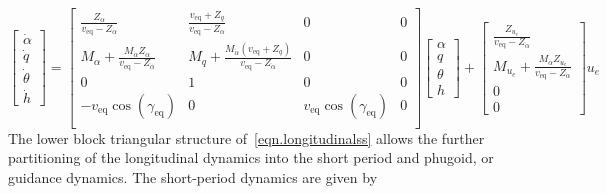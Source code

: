 \documentclass[]{../sty/aiaa-tc}
\theoremstyle{examplestyle}
\begin{document}
  \begin{equation}
    \label{eqn.longitudinalss}
    \begin{bmatrix}
      \dot{\alpha} \\
      \dot{q} \\
      \dot{\theta} \\
      \dot{h}
    \end{bmatrix}=
    \begin{bmatrix}
      \frac{Z_{\alpha}}{v_{\text{eq}}-Z_{\dot{\alpha}}} & \frac{v_{\text{eq}}+Z_{q}}{v_{\text{eq}}-Z_{\dot{\alpha}}} & 0 & 0 \\
      M_{\alpha}+\frac{M_{\dot{\alpha}}Z_{\alpha}}{v_{\text{eq}}-Z_{\dot{\alpha}}} & M_{q}+\frac{M_{\dot{\alpha}}(v_{\text{eq}}+Z_{q})}{v_{\text{eq}}-Z_{\dot{\alpha}}} & 0 & 0 \\
      0 & 1 & 0 & 0 \\
      -v_{\text{eq}}\cos(\gamma_{\text{eq}}) & 0 & v_{\text{eq}}\cos(\gamma_{\text{eq}}) & 0 \\
    \end{bmatrix}
    \begin{bmatrix}
      \alpha \\
      q \\
      \theta \\
      h
    \end{bmatrix}+
    \begin{bmatrix}
      \frac{Z_{u_{e}}}{v_{\text{eq}}-Z_{\dot{\alpha}}} \\
      M_{u_{e}}+\frac{M_{\dot{\alpha}}Z_{u_{e}}}{v_{\text{eq}}-Z_{\dot{\alpha}}} \\
      0 \\
      0
    \end{bmatrix}
    u_{e}
  \end{equation}
  The lower block triangular structure of\ \eqref{eqn.longitudinalss} allows the further partitioning of the longitudinal dynamics into the short period and phugoid, or guidance dynamics.
  The short-period dynamics are given by
\end{document}
